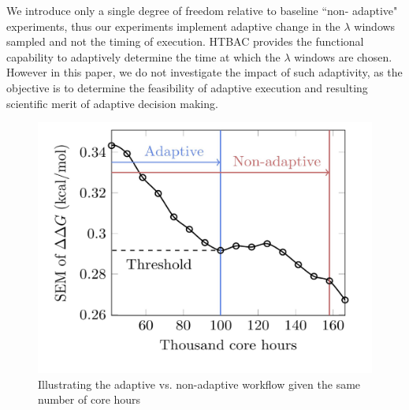 

We introduce only a single degree of freedom relative to baseline ``non-
adaptive" experiments, thus our experiments implement adaptive change in the
$\lambda$ windows sampled and not the timing of execution. HTBAC provides the
functional capability to adaptively determine the time at which the $\lambda$
windows are chosen. However in this paper, we do not investigate the impact
of such adaptivity, as the objective is to determine the feasibility of
adaptive execution and resulting scientific merit of adaptive decision
making.


\begin{figure}
  \centering
    \includegraphics[width=\columnwidth]{figures/adaptive_vs_nonadaptive_pseudo.pdf}
    \caption{Illustrating the adaptive vs. non-adaptive workflow given the
    same number of core hours}
\label{fig:adaptive_vs_nonadaptive_TIES}
\end{figure}

